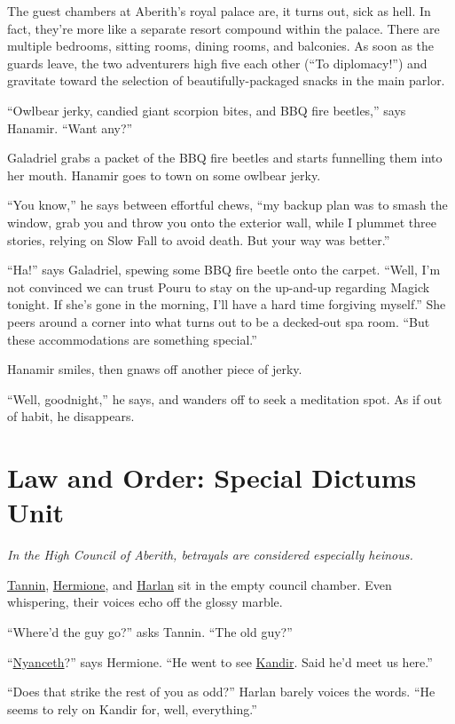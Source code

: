 \documentclass[smalldemyvopaper,11pt,twoside,onecolumn,openright,extrafontsizes]{memoir}
\newcommand{\chapdesc}[1]{
    \begin{flushright}
    \emph{{#1}}
    \end{flushright}
    \vspace{26pt}
}
\begin{document}
The guest chambers at Aberith's royal palace are, it turns out, sick as
hell. In fact, they're more like a separate resort compound within the
palace. There are multiple bedrooms, sitting rooms, dining rooms, and
balconies. As soon as the guards leave, the two adventurers high five
each other (``To diplomacy!'') and gravitate toward the selection of
beautifully-packaged snacks in the main parlor.

``Owlbear jerky, candied giant scorpion bites, and BBQ fire beetles,''
says Hanamir. ``Want any?''

Galadriel grabs a packet of the BBQ fire beetles and starts funnelling
them into her mouth. Hanamir goes to town on some owlbear jerky.

``You know,'' he says between effortful chews, ``my backup plan was to
smash the window, grab you and throw you onto the exterior wall, while I
plummet three stories, relying on Slow Fall to avoid death. But your way
was better.''

``Ha!'' says Galadriel, spewing some BBQ fire beetle onto the carpet.
``Well, I'm not convinced we can trust Pouru to stay on the up-and-up
regarding Magick tonight. If she's gone in the morning, I'll have a hard
time forgiving myself.'' She peers around a corner into what turns out
to be a decked-out spa room. ``But these accommodations are something
special.''

Hanamir smiles, then gnaws off another piece of jerky.

``Well, goodnight,'' he says, and wanders off to seek a meditation spot.
As if out of habit, he disappears.


\chapter{Law and Order: Special Dictums Unit}
\chapdesc{In the High Council of Aberith, betrayals are considered especially heinous.}

\href{/characters/tannin/}{Tannin},
\href{/characters/hermione/}{Hermione}, and
\href{/characters/harlan/}{Harlan} sit in the empty council chamber.
Even whispering, their voices echo off the glossy marble.

``Where'd the guy go?'' asks Tannin. ``The old guy?''

``\href{/characters/nyanceth/}{Nyanceth}?'' says Hermione. ``He went to
see \href{/characters/kandir/}{Kandir}. Said he'd meet us here.''

``Does that strike the rest of you as odd?'' Harlan barely voices the
words. ``He seems to rely on Kandir for, well, everything.''
\end{document}
